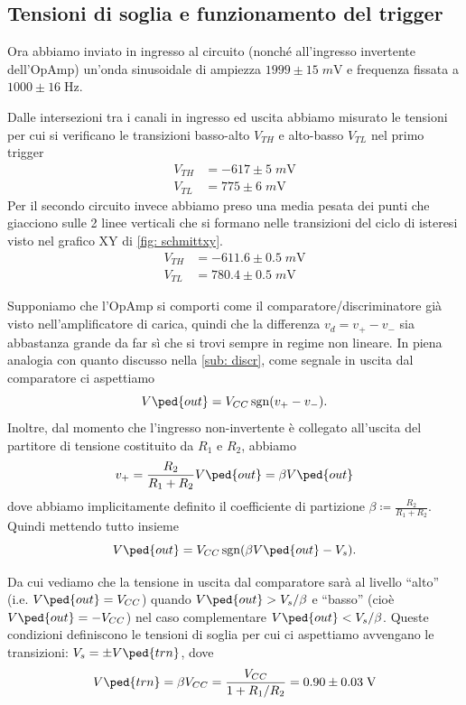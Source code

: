 \documentclass[10pt, a4paper, italian]{article}
\begin{document}
\subsection{Tensioni di soglia e funzionamento del trigger}
Ora abbiamo inviato in ingresso al circuito (nonché all'ingresso invertente
dell'OpAmp) un'onda sinusoidale di ampiezza
$1999 \pm 15 \; \si{m\V}$ e frequenza fissata a $1000 \pm 16 \; \si{\Hz}$.

Dalle intersezioni tra i canali in ingresso ed uscita abbiamo misurato le
tensioni per cui si verificano le transizioni basso-alto $V_{TH}$ e alto-basso
$V_{TL}$ nel primo trigger
\begin{align*}
V_{TH} &= -617 \pm 5 \; \si{m\V} \\
V_{TL} &= 775 \pm 6 \; \si{m\V}
\end{align*}
Per il secondo circuito invece abbiamo preso una media pesata dei punti che
giacciono sulle 2 linee verticali che si formano nelle transizioni del ciclo
di isteresi visto nel grafico XY di \cref{fig: schmittxy}.
\begin{align*}
V_{TH} &= -611.6 \pm 0.5 \; \si{m\V} \\
V_{TL} &= 780.4 \pm 0.5 \; \si{m\V}
\end{align*}

Supponiamo che l'OpAmp si comporti come il comparatore/discriminatore già
visto nell'amplificatore di carica, quindi che la differenza
$v_d = v_+ - v_- $ sia abbastanza grande da far sì che si trovi sempre in
regime non lineare. In piena analogia con quanto discusso nella
\cref{sub: discr}, come segnale in uscita dal comparatore ci aspettiamo
\[
V\ped{out} = V_{CC} \sgn(v_+ - v_-)
.\]
Inoltre, dal momento che l'ingresso non-invertente è collegato all'uscita del
partitore di tensione costituito da $R_1$ e $R_2$, abbiamo
\[
v_+ = \frac{R_2}{R_1 + R_2} V \ped{out} = \beta V\ped{out}
\]
dove abbiamo implicitamente definito il coefficiente di partizione
$\beta \coloneqq \frac{R_2}{R_1 + R_2}$. Quindi mettendo tutto insieme
\[
V\ped{out} = V_{CC} \sgn(\beta V\ped{out} - V_s)
.\]

Da cui vediamo che la tensione in uscita dal comparatore sarà al livello
``alto'' (i.e. $V\ped{out} = V_{CC}$) quando $V\ped{out} > V_s/\beta$ e
``basso'' (cioè $V\ped{out} = -V_{CC}$) nel caso complementare
$V\ped{out} < V_s/\beta$. Queste condizioni definiscono le tensioni di soglia
per cui ci aspettiamo avvengano le transizioni:
$V_s = \pm V\ped{trn}$, dove
\begin{equation}
V\ped{trn} = \beta V_{CC} = \frac{V_{CC}}{1 + R_1/R_2} =
0.90 \pm 0.03 \; \si{\V}
\end{equation}
\end{document}
